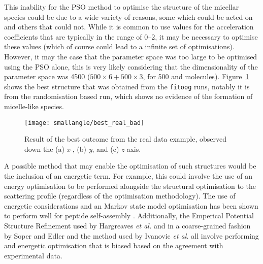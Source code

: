 This inability for the PSO method to optimise the structure of the micellar species could be due to a wide variety of reasons, some which could be acted on and others that could not.
While it is common to use values for the acceleration coefficients that are typically in the range of \numrange{0}{2}, it may be necessary to optimise these values (which of course could lead to a infinite set of optimisations).
However, it may the case that the parameter space was too large to be optimised using the PSO alone, this is very likely considering that the dimensionality of the parameter space was 4500 ($500\times6+500\times3$, for 500  and  molecules).
Figure~\ref{fig:best_real_bad} shows the best structure that was obtained from the \texttt{fitoog} runs, notably it is from the randomisation based run, which shows no evidence of the formation of micelle-like species.
%
\begin{figure}
    \centering
    \texttt{[image: smallangle/best\_real\_bad]}
    \caption{Result of the best outcome from the real data example, observed down the (a) \emph{x}-, (b) \emph{y}, and (c) \emph{z}-axis.}
    \label{fig:best_real_bad}
\end{figure}
%

A possible method that may enable the optimisation of such structures would be the inclusion of an energetic term.
For example, this could involve the use of an energy optimisation to be performed alongside the structural optimisation to the scattering profile (regardless of the optimisation methodology).
The use of energetic considerations and an Markov state model optimisation has been shown to perform well for peptide self-assembly \cite{sengupta_automated_2019}.
Additionally, the Emperical Potential Structure Refinement used by Hargreaves \emph{et al.} \cite{hargreaves_atomistic_2011} and in a coarse-grained fashion by Soper and Edler\autocite{soper_coarse-grained_2017} and the method used by Ivanovic \emph{et al.} \cite{ivanovic_temperature-dependent_2018} all involve performing and energetic optimisation that is biased based on the agreement with experimental data.
